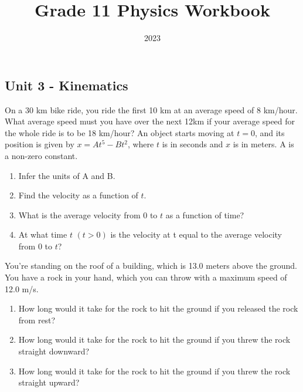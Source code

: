 \documentclass[12pt,addpoints]{exam}
\date{2023}
\begin{document}
	\title{Grade 11 Physics Workbook}
	\maketitle
	
	\begin{center}
		\section*{Unit 3 - Kinematics}
		\begin{questions}
			\question On a 30 km bike ride, you ride the first 10 km at an average speed of 8 km/hour. What average speed must you have over the next 12km if your average speed for the whole ride is to be 18 km/hour?\vspace{1.3in}
			\question An object starts moving at $t = 0$, and its position is given by $x = At^5 - Bt^2$, where $t$ is in seconds and $x$ is in meters. A is a non-zero constant.
			\begin{enumerate}[label=(\alph*)]
				\item Infer the units of A and B.\vspace{0.8in}
				\item Find the velocity as a function of $t$.\vspace{1in}
				\item What is the average velocity from $0$ to $t$ as a
				function of time?\vspace{1in}
				\item At what time $t$ $(t > 0)$ is the velocity at t
				equal to the average velocity from $0$ to $t$?\vspace{1in}
			\end{enumerate}
			\question You’re standing on the roof of a building, which is 13.0 meters above the ground. You have a rock in your hand, which you can throw with a maximum speed of 12.0 m/s.
			\begin{enumerate}[label=(\alph*)]
				\item How long would it take for the rock to hit the
				ground if you released the rock from rest?\vspace{1in}
				\item How long would it take for the rock to hit the
				ground if you threw the rock straight downward?\vspace{1in}
				\item How long would it take for the rock to hit the
				ground if you threw the rock straight upward?\vspace{1in}

\end{enumerate}
\end{questions}
\end{center}
\end{document}
